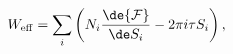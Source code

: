 \begin{equation}
  \label{eq:Weff1}
  W_{\rm eff}= 
\sum_i \left( N_i \frac{\de {\cal F}}{\de S_i} - 2\pi i\tau S_i \right),
\end{equation}

